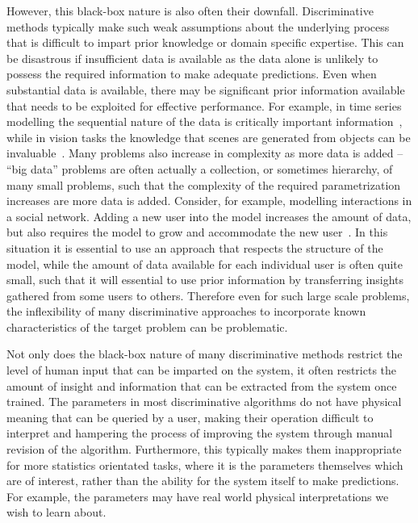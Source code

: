 However, this black-box nature is also often their downfall.  Discriminative methods typically make
such weak assumptions about the underlying process that is difficult to impart prior knowledge
or domain specific expertise.  This can be disastrous if insufficient data is available as the data
alone is unlikely to possess the required information to make adequate predictions.  Even when
substantial data is available, there may be significant prior information available that needs to be
exploited for effective performance.  For example, in time series modelling the sequential nature
of the data is critically important information~\citep{liu1998sequential}, while in vision tasks the 
knowledge that scenes are generated from objects can be invaluable~\citep{kulkarni2015picture}.
Many problems also increase in complexity as more data is added -- ``big data'' problems are often
actually a collection, or sometimes hierarchy, of many small problems, such that the complexity of the
required parametrization increases are more data is added.  Consider, for example, modelling interactions in
a social network.  Adding a new user into the model increases the amount of data, but also
requires the model to grow and accommodate the new user~\citep{ravasz2003hierarchical}.  In
this situation it is essential to
use an approach that respects the structure of the model, while the amount of data available
for each individual user is often quite small, such that it will essential to use prior information
by transferring insights gathered from some users to others.  Therefore even for such large scale
problems, the inflexibility of many discriminative approaches to incorporate known characteristics
of the target problem can be problematic.

Not only does the black-box nature of many discriminative methods restrict the level of
human input that can be imparted on the system, it often restricts the amount of insight
and information that can be extracted from the system once trained.  The parameters in most discriminative
algorithms do not have physical meaning that can be queried by a user, making their operation
difficult to interpret and hampering the process of improving the system through manual
revision of the algorithm.  Furthermore, this typically makes them inappropriate for more
statistics orientated tasks, where it is the parameters themselves which are of interest, rather
than the ability for the system itself to make predictions.  For example, the parameters may
have real world physical interpretations we wish to learn about.

